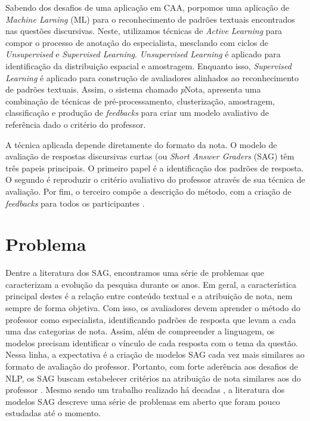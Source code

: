 Sabendo dos desafios de uma aplicação em CAA, porpomos uma aplicação de \textit{Machine Larning} (ML) para o reconhecimento de padrões textuais encontrados nas questões discursivas. Neste, utilizamos técnicas de \textit{Active Learning} para compor o processo de anotação do especialista, mesclando com ciclos de \textit{Unsupervised} e \textit{Supervised Learning}. \textit{Unsupervised Learning} é aplicado para identificação da distribuição espacial e amostragem. Enquanto isso, \textit{Supervised Learning} é aplicado para construção de avaliadores alinhados ao reconhecimento de padrões textuais. Assim, o sistema chamado \textit{p}Nota, apresenta uma combinação de técnicas de pré-processamento, clusterização, amostragem, classificação e produção de \textit{feedbacks} para criar um modelo avaliativo de referência dado o critério do professor.

A técnica aplicada depende diretamente do formato da nota. O modelo de avaliação de respostas discursivas curtas (ou \textit{Short Answer Graders} (SAG) têm três papeis principais. O primeiro papel é a identificação dos padrões de resposta. O segundo é reproduzir o critério avaliativo do professor através de sua técnica de avaliação. Por fim, o terceiro compõe a descrição do método, com a criação de \textit{feedbacks} para todos os participantes \cite{arter2006, spalenza2016a}.


\section{Problema} 
\label{cap1-problema}

Dentre a literatura dos SAG, encontramos uma série de problemas que caracterizam a evolução da pesquisa durante os anos. Em geral, a característica principal destes é a relação entre conteúdo textual e a atribuição de nota, nem sempre de forma objetiva. Com isso, os avaliadores devem aprender o método do professor como especialista, identificando padrões de resposta que levam a cada uma das categorias de nota. Assim, além de compreender a linguagem, os modelos precisam identificar o vínculo de cada resposta com o tema da questão. Nessa linha, a expectativa é a criação de modelos SAG cada vez mais similares ao formato de avaliação do professor. Portanto, com forte aderência aos desafios de NLP, os SAG buscam estabelecer critérios na atribuição de nota similares aos do professor \cite{pado2021}. Mesmo sendo um trabalho realizado há decadas \cite{burrows2015}, a literatura dos modelos SAG descreve uma série de problemas em aberto que foram pouco estudadas até o momento.

